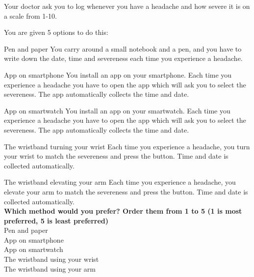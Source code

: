 Your doctor ask you to log whenever you have a headache and how severe it is on a scale from 1-10.

You are given 5 options to do this:

Pen and paper
You carry around a small notebook and a pen, and you have to write down the date, time and severeness each time you experience a headache.

App on smartphone
You install an app on your smartphone. Each time you experience a headache you have to open the app which will ask you to select the severeness. The app automatically collects the time and date.

App on smartwatch
You install an app on your smartwatch. Each time you experience a headache you have to open the app which will ask you to select the severeness. The app automatically collects the time and date.

The wristband turning your wrist
Each time you experience a headache, you turn your wrist to match the severeness and press the button. Time and date is collected automatically.

The wristband elevating your arm
Each time you experience a headache, you elevate your arm to match the severeness and press the button. Time and date is collected automatically.\\
\textbf{Which method would you prefer? Order them from 1 to 5 (1 is most preferred, 5 is least preferred)}\\
Pen and paper\\
App on smartphone\\
App on smartwatch\\
The wristband using your wrist\\
The wristband using your arm






